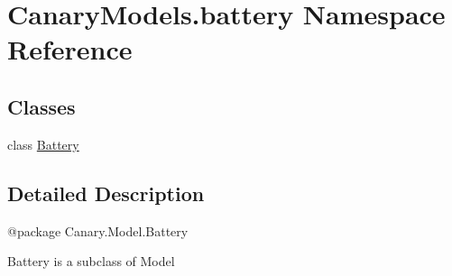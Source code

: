 \hypertarget{namespace_canary_models_1_1battery}{\section{Canary\-Models.\-battery Namespace Reference}
\label{namespace_canary_models_1_1battery}
}
\subsection*{Classes}
\begin{DoxyCompactItemize}
\item 
class \hyperlink{class_canary_models_1_1battery_1_1_battery}{Battery}
\end{DoxyCompactItemize}


\subsection{Detailed Description}
\begin{DoxyVerb}@package Canary.Model.Battery

Battery is a subclass of Model
\end{DoxyVerb}
 